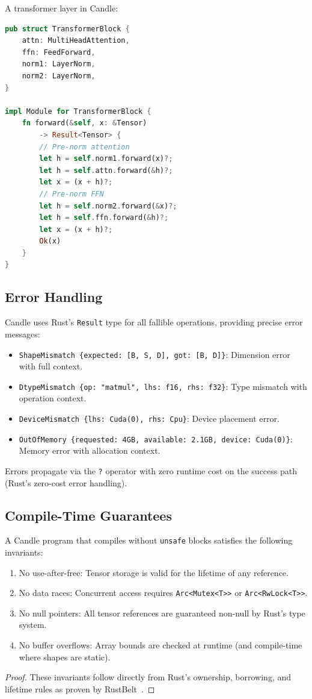 A transformer layer in Candle:

\begin{lstlisting}[language=Rust,caption={Transformer layer definition.}]
pub struct TransformerBlock {
    attn: MultiHeadAttention,
    ffn: FeedForward,
    norm1: LayerNorm,
    norm2: LayerNorm,
}

impl Module for TransformerBlock {
    fn forward(&self, x: &Tensor)
        -> Result<Tensor> {
        // Pre-norm attention
        let h = self.norm1.forward(x)?;
        let h = self.attn.forward(&h)?;
        let x = (x + h)?;
        // Pre-norm FFN
        let h = self.norm2.forward(&x)?;
        let h = self.ffn.forward(&h)?;
        let x = (x + h)?;
        Ok(x)
    }
}
\end{lstlisting}

\subsection{Error Handling}

Candle uses Rust's \texttt{Result} type for all fallible operations, providing precise error messages:

\begin{itemize}[leftmargin=1.1em]
    \item \texttt{ShapeMismatch \{expected: [B, S, D], got: [B, D]\}}: Dimension error with full context.
    \item \texttt{DtypeMismatch \{op: "matmul", lhs: f16, rhs: f32\}}: Type mismatch with operation context.
    \item \texttt{DeviceMismatch \{lhs: Cuda(0), rhs: Cpu\}}: Device placement error.
    \item \texttt{OutOfMemory \{requested: 4GB, available: 2.1GB, device: Cuda(0)\}}: Memory error with allocation context.
\end{itemize}

Errors propagate via the \texttt{?} operator with zero runtime cost on the success path (Rust's zero-cost error handling).

\subsection{Compile-Time Guarantees}

\begin{theorem}
A Candle program that compiles without \texttt{unsafe} blocks satisfies the following invariants:
\begin{enumerate}[leftmargin=1.4em]
    \item No use-after-free: Tensor storage is valid for the lifetime of any reference.
    \item No data races: Concurrent access requires \texttt{Arc<Mutex<T>>} or \texttt{Arc<RwLock<T>>}.
    \item No null pointers: All tensor references are guaranteed non-null by Rust's type system.
    \item No buffer overflows: Array bounds are checked at runtime (and compile-time where shapes are static).
\end{enumerate}
\end{theorem}

\begin{proof}
These invariants follow directly from Rust's ownership, borrowing, and lifetime rules as proven by RustBelt~\cite{jung2018rustbelt}.
\end{proof}

